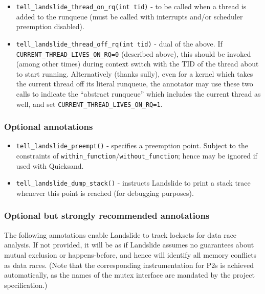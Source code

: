 \begin{itemize}
\item {\tt tell\_landslide\_thread\_on\_rq(int tid)} - to be called when a thread is added to the runqueue
	(must be called with interrupts and/or scheduler preemption disabled).
\item {\tt tell\_landslide\_thread\_off\_rq(int tid)} - dual of the above.
	If {\tt CURRENT\_THREAD\_\allowbreak{}LIVES\_ON\_RQ=0} (described above), this should be invoked (among other times) during context switch with the TID of the thread about to start running.
	Alternatively (thanks sully), even for a kernel which takes the current thread off its literal runqueue,
	the annotator may use these two calls to indicate the ``abstract runqueue'' which includes the current thread as well,
	and set {\tt CURRENT\_THREAD\_LIVES\_ON\_RQ=1}.
\end{itemize}

\subsubsection{Optional annotations}

\begin{itemize}
\item {\tt tell\_landslide\_preempt()} - specifies a preemption point.
	Subject to the constraints of {\tt within\_function}/{\tt without\_function};
	hence may be ignored if used with Quicksand.
\item {\tt tell\_landslide\_dump\_stack()} - instructs Landslide to print a stack trace whenever this point is reached (for debugging purposes).
\end{itemize}

\subsubsection{Optional but strongly recommended annotations}

The following annotations enable Landslide to track locksets for data race analysis.
If not provided, it will be as if Landslide assumes no guarantees about mutual exclusion or happens-before,
and hence will identify all memory conflicts as data races.
(Note that the corresponding instrumentation for P2s is achieved automatically,
as the names of the mutex interface are mandated by the project specification.)

